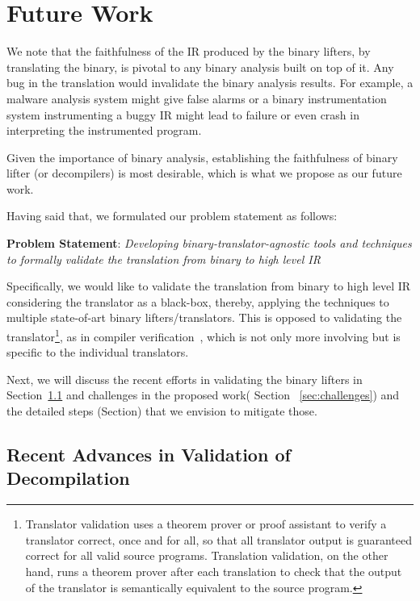 \chapter{Future Work}\label{sec:problem}

We note that the faithfulness of the IR produced by the binary lifters, by
translating the binary, is pivotal to any binary analysis built on top of it.
Any bug in the translation would invalidate the binary analysis results. For
example, a malware analysis system might give false alarms or a binary
instrumentation system instrumenting a buggy IR might lead to failure or even
crash in interpreting the instrumented program. 

Given the importance of binary analysis, establishing the faithfulness of
binary lifter (or decompilers) is most desirable, which is what we propose as
our future work.

Having said that, we formulated our problem statement as follows:

\vspace{10pt}

\noindent\textbf{Problem Statement}: \emph{Developing binary-translator-agnostic tools and techniques to formally  
    validate the translation from binary to high level IR}

Specifically, we would like to validate the translation from binary to high
level IR considering the translator as a black-box, thereby, applying the
techniques to multiple state-of-art binary lifters/translators. This is
opposed to validating the translator\footnote{Translator validation uses a
  theorem prover or proof assistant to verify a translator correct, once and
    for all, so that all translator output is guaranteed correct for all valid
      source programs. Translation validation, on the other hand, runs a
        theorem prover after each translation to check that the output of the
        translator is semantically equivalent to the source program.}, as
         in  compiler verification~\cite{Leroy:2009}, which
        is not only more involving but is specific to the individual
        translators.

Next, we will discuss the recent efforts in validating the binary lifters in
Section~\ref{sec:recent-advances} and challenges in the proposed work( Section
    ~\ref{sec:challenges}) and the detailed steps (Section) that we envision to
mitigate those.

\section{Recent Advances in Validation of Decompilation}\label{sec:recent-advances}

